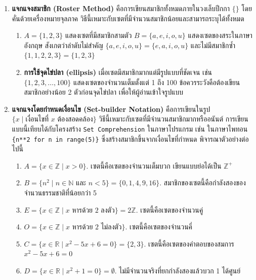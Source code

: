 \begin{enumerate}
    \item \textbf{แจกแจงสมาชิก (Roster Method)} คือการเขียนสมาชิกทั้งหมดภายในวงเล็บปีกกา $\{\}$ โดยคั่นด้วยเครื่องหมายจุลภาค วิธีนี้เหมาะกับเซตที่มีจำนวนสมาชิกน้อยและสามารถระบุได้ทั้งหมด

    \begin{enumerate}[leftmargin=2.5em,label=\arabic*.]
        \item $A = \{1, 2, 3\}$ แสดงเซตที่มีสมาชิกสามตัว $B = \{a, e, i, o, u\}$ แสดงเซตของสระในภาษาอังกฤษ สังเกตว่าลำดับไม่สำคัญ $\{a, e, i, o, u\} = \{e, a, i, o, u\}$ และไม่มีสมาชิกซ้ำ $\{1, 1, 2, 2, 3\} = \{1, 2, 3\}$
        \item \textbf{การใช้จุดไข่ปลา (ellipsis)} เมื่อเซตมีสมาชิกมากแต่มีรูปแบบที่ชัดเจน เช่น $\{1, 2, 3, \ldots, 100\}$ แสดงเซตของจำนวนเต็มตั้งแต่ 1 ถึง 100 ข้อควรระวังคือต้องเขียนสมาชิกอย่างน้อย 2 ตัวก่อนจุดไข่ปลา เพื่อให้ผู้อ่านเข้าใจรูปแบบ
    \end{enumerate}

    \item \textbf{แจกแจงโดยกำหนดเงื่อนไข (Set-builder Notation)} คือการเขียนในรูป $\{x \mid \text{เงื่อนไขที่ } x \text{ ต้องสอดคล้อง}\}$ วิธีนี้เหมาะกับเซตที่มีจำนวนสมาชิกมากหรืออนันต์ การเขียนแบบนี้เทียบได้กับโครงสร้าง \texttt{Set Comprehension} ในภาษาโปรแกรม เช่น ในภาษาไพทอน \texttt{\{n**2 for n in range(5)\}} ซึ่งสร้างสมาชิกขึ้นจากเงื่อนไขที่กำหนด พิจารณาตัวอย่างต่อไปนี้
    \begin{enumerate}[leftmargin=2.5em,label=\arabic*.]
        \item $A = \{x \in \mathbb{Z} \mid x > 0\}$. เซตนี้คือเซตของจำนวนเต็มบวก เขียนแบบย่อได้เป็น $\mathbb{Z}^+$
        \item $B = \{n^2 \mid n \in \mathbb{N} \text{ และ } n < 5\} = \{0, 1, 4, 9, 16\}$. สมาชิกของเซตนี้คือกำลังสองของจำนวนธรรมชาติที่น้อยกว่า 5
        \item $E = \{x \in \mathbb{Z} \mid x \text{ หารด้วย } 2 \text{ ลงตัว}\} = 2\mathbb{Z}$. เซตนี้คือเซตของจำนวนคู่
        \item $O = \{x \in \mathbb{Z} \mid x \text{ หารด้วย } 2 \text{ ไม่ลงตัว}\}$. เซตนี้คือเซตของจำนวนคี่
        \item $C = \{x \in \mathbb{R} \mid x^2 - 5x + 6 = 0\} = \{2, 3\}$. เซตนี้คือเซตของคำตอบของสมการ $x^2 - 5x + 6 = 0$
        \item $D = \{x \in \mathbb{R} \mid x^2 + 1 = 0\} = \emptyset$. ไม่มีจำนวนจริงที่ยกกำลังสองแล้วบวก 1 ได้ศูนย์
    \end{enumerate}
\end{enumerate}

